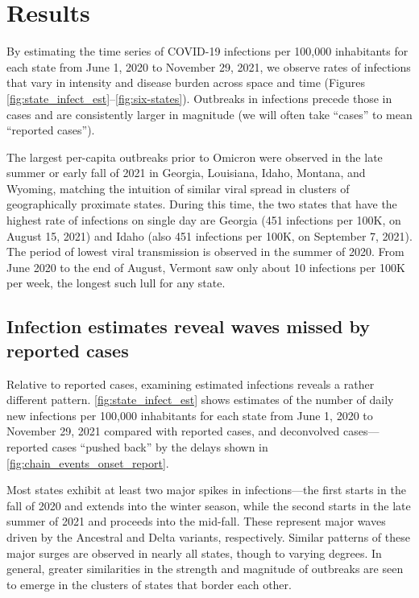 \section{Results}
\label{sec:results}

By estimating the time series of COVID-19 infections per 100,000 inhabitants
for each \US state from June 1, 2020 to November 29, 2021, we observe rates of
infections that vary in intensity and disease burden across space and time
(Figures \ref{fig:state_infect_est}--\ref{fig:six-states}). Outbreaks in
infections precede those in cases and are consistently larger in magnitude
(we will often take ``cases'' to mean ``reported cases'').

The largest per-capita outbreaks prior to Omicron were observed in the late
summer or early fall of 2021 in Georgia, Louisiana, Idaho, Montana, and Wyoming,
matching the intuition of similar viral spread in clusters of geographically
proximate states. During this time, the two states that have the highest rate of
infections on single day are Georgia (451 infections per 100K, on August 15,
2021) and Idaho (also 451 infections per 100K, on September 7, 2021). The period
of lowest viral transmission is observed in the summer of 2020. From June 2020
to the end of August, Vermont saw only about 10 infections per 100K per week,
the longest such lull for any state.



\subsection{Infection estimates reveal waves missed by reported cases}
\label{sec:omitted-waves}

Relative to reported cases, examining estimated infections reveals a
rather different pattern. \autoref{fig:state_infect_est} shows
estimates of the number of daily new infections per 100,000 inhabitants for each
\US state from June 1, 2020 to November 29, 2021 compared with reported cases,
and deconvolved cases---reported cases ``pushed back'' by the delays shown in
\autoref{fig:chain_events_onset_report}. 

Most states exhibit at least two major spikes in infections---the first starts
in the fall of 2020 and extends into the winter season, while the second starts
in the late summer of 2021 and proceeds into the mid-fall. These represent major
waves driven by the Ancestral and Delta variants, respectively. Similar patterns
of these major surges are observed in nearly all states, though to varying
degrees. In general, greater similarities in the strength and magnitude of
outbreaks are seen to emerge in the clusters of states that border each other.

